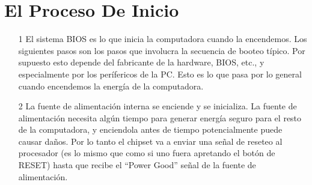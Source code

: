 \section{El Proceso De Inicio}\label{sec:el proceso de inicio}


	\begin{enumerate}
		\item[1]El sistema BIOS es lo que inicia la computadora cuando la
			encendemos.  Los siguientes pasos son los pasos que involucra la
			secuencia de booteo típico.  Por supuesto esto depende del
			fabricante de la hardware, BIOS, etc., y especialmente por los
			perífericos de la PC. Esto es lo que pasa por lo general cuando
			encendemos la energía de la computadora.

	
		\item[2] La fuente de alimentación interna se enciende y se inicializa.
			La fuente de alimentación necesita algún tiempo para generar
			energía seguro para el resto de la computadora, y enciendola antes
			de tiempo potencialmente puede causar daños. Por lo tanto el
			chipset va a enviar una señal de reseteo al procesador (es lo mismo
			que como si uno fuera apretando el botón de RESET) hasta que recibe
			el ``Power Good'' señal de la fuente de alimentación.

	

\end{enumerate}
